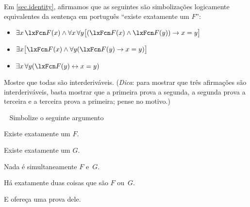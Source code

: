 \problempart
Em \cref{sec.identity}, afirmamos que as seguintes são simbolizações logicamente equivalentes da sentença em português \textquotedblleft existe exatamente um $F$\textquotedblright{}:
\begin{itemize}
\item $\exists x\,\atom{F}{x} \eand \forall x\, \forall y \bigl[(\atom{F}{x} \eand \atom{F}{y}) \eif x = y\bigr]$
\item $\exists x \bigl[\atom{F}{x} \eand \forall y (\atom{F}{y} \eif x = y)\bigr]$
\item $\exists x\, \forall y (\atom{F}{y} \eiff x = y)$
\end{itemize}
Mostre que todas são interderiváveis. (\emph{Dica}: para mostrar que três afirmações são interderiváveis, basta mostrar que a primeira prova a segunda, a segunda prova a terceira e a terceira prova a primeira; pense no motivo.)


\
\problempart
Simbolize o seguinte argumento
	\begin{earg}
		\item Existe exatamente um $F$.
		\item Existe exatamente um $G$.
		\item Nada é simultaneamente $F$ e~$G$.
		\item[\texttherefore] Há exatamente duas coisas que são $F$ ou~$G$.
	\end{earg}
E ofereça uma prova dele.




